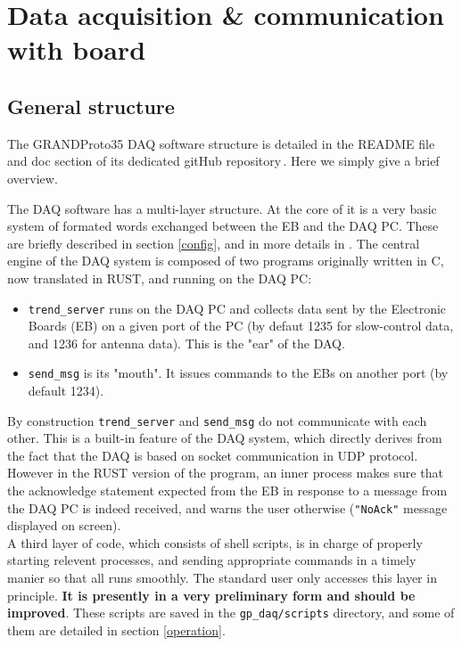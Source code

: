 \section{Data acquisition \& communication with board} 
\label{DAQ}

\subsection{General structure}
\label{DAQstruct}
The GRANDProto35 DAQ software structure is detailed in the README file and doc section of its dedicated gitHub repository\,\cite{daq_git}. Here we simply give a brief overview. 

The DAQ software has a multi-layer structure. At the core of it is a very basic system of formated words exchanged between the EB and the DAQ PC. These are briefly described in section \ref{config}, and in more details in \cite{GP35daq}. The central engine of the DAQ system is composed of two programs originally written in C, now translated in RUST, and running on the DAQ PC:
\begin{itemize}
\item{\texttt{trend\_server} runs on the DAQ PC and collects data sent by the Electronic Boards (EB) on a given port of the PC (by defaut 1235 for slow-control data, and 1236 for antenna data). This is the "ear" of the DAQ.}
\item{\texttt{send\_msg} is its "mouth". It issues commands to the EBs on another port (by default 1234).}
\end{itemize}
By construction \texttt{trend\_server} and \texttt{send\_msg} do not communicate with each other. This is a built-in feature of the DAQ system, which directly derives from the fact that the DAQ is based on socket communication in UDP protocol. However in the RUST version of the program, an inner process makes sure that the acknowledge statement expected from the EB in response to a message from the DAQ PC is indeed received, and warns the user otherwise (\texttt{"NoAck"} message displayed on screen).  \\
%
A third layer of code, which consists of shell scripts, is in charge of properly starting relevent processes, and sending appropriate commands in a timely manier so that all runs smoothly. The standard user only accesses this layer in principle. {\bf It is presently in a very preliminary form and should be improved}. These scripts are saved in the \texttt{gp\_daq/scripts} directory, and some of them are detailed in section \ref{operation}.

